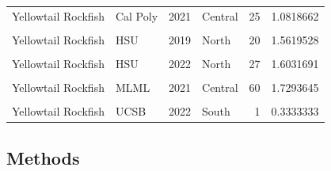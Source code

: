 \documentclass[
]{article}
\begin{document}
\begin{longtable}[t]{llrlrr}
Yellowtail Rockfish & Cal Poly & 2021 & Central & 25 & 1.0818662\\
\cellcolor{gray!6}{Yellowtail Rockfish} & \cellcolor{gray!6}{Cal Poly} & \cellcolor{gray!6}{2022} & \cellcolor{gray!6}{Central} & \cellcolor{gray!6}{15} & \cellcolor{gray!6}{0.8112033}\\
\addlinespace
Yellowtail Rockfish & HSU & 2019 & North & 20 & 1.5619528\\
\cellcolor{gray!6}{Yellowtail Rockfish} & \cellcolor{gray!6}{HSU} & \cellcolor{gray!6}{2021} & \cellcolor{gray!6}{North} & \cellcolor{gray!6}{99} & \cellcolor{gray!6}{3.3817745}\\
Yellowtail Rockfish & HSU & 2022 & North & 27 & 1.6031691\\
\cellcolor{gray!6}{Yellowtail Rockfish} & \cellcolor{gray!6}{MLML} & \cellcolor{gray!6}{2019} & \cellcolor{gray!6}{Central} & \cellcolor{gray!6}{21} & \cellcolor{gray!6}{1.1338576}\\
Yellowtail Rockfish & MLML & 2021 & Central & 60 & 1.7293645\\
\addlinespace
\cellcolor{gray!6}{Yellowtail Rockfish} & \cellcolor{gray!6}{MLML} & \cellcolor{gray!6}{2022} & \cellcolor{gray!6}{Central} & \cellcolor{gray!6}{46} & \cellcolor{gray!6}{1.0150536}\\
Yellowtail Rockfish & UCSB & 2022 & South & 1 & 0.3333333\\*
\end{longtable}

\hypertarget{methods}{%
\subsection{Methods}\label{methods}}
\end{document}
